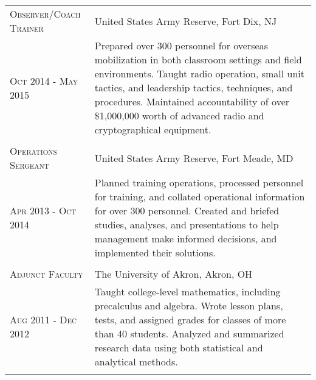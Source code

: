 \documentclass[letterpaper,10pt]{article} %
\begin{document}
\begin{center}
\begin{tabular}{R{4.25cm}L{11.25cm}}

\textsc{Observer/Coach Trainer} & United States Army Reserve, Fort Dix, NJ\\ 
\textsc{Oct 2014 - May 2015} & Prepared over 300 personnel for overseas mobilization in both classroom settings and field environments.  Taught radio operation, small unit tactics, and leadership tactics, techniques, and procedures.  Maintained accountability of over \$1,000,000 worth of advanced radio and cryptographical equipment.\\
 \\


\textsc{Operations Sergeant} & United States Army Reserve, Fort Meade, MD\\
\textsc{Apr 2013 - Oct 2014} & Planned training operations, processed personnel for training, and collated operational information for over 300 personnel.  Created and briefed studies, analyses, and presentations to help management make informed decisions, and implemented their solutions.\\
 \\


\textsc{Adjunct Faculty} & The University of Akron, Akron, OH\\
\textsc{Aug 2011 - Dec 2012} & Taught college-level mathematics, including precalculus and algebra.  Wrote lesson plans, tests, and assigned grades for classes of more than 40 students.  Analyzed and summarized research data using both statistical and analytical methods.\\
 \\

\end{tabular}
\end{center}
\end{document}
